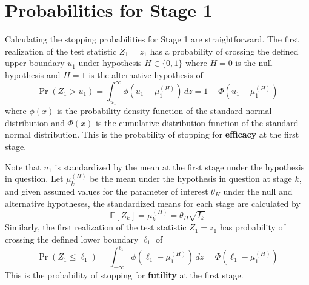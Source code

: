 \documentclass{article}
\begin{document}
\section{Probabilities for Stage 1}
%
Calculating the stopping probabilities for Stage 1 are straightforward. The first realization of the test statistic $Z_1=z_1$ has a probability of crossing the defined upper boundary $u_1$ under hypothesis $H\in\{0,1\}$ where $H=0$ is the null hypothesis and $H=1$ is the alternative hypothesis of
\begin{equation}
    \Pr(Z_1 > u_1)=\int_{u_1}^\infty \phi\left(u_1-\mu_1^{(H)}\right)\,dz=1-\Phi\left(u_1-\mu_1^{(H)}\right)
\end{equation}
%
where $\phi(x)$ is the probability density function of the standard normal distribution and $\Phi(x)$ is the cumulative distribution function of the standard normal distribution. This is the probability of stopping for \textbf{efficacy} at the first stage.

Note that $u_1$ is standardized by the mean at the first stage under the hypothesis in question. Let $\mu_{k}^{(H)}$ be the mean under the  hypothesis in question at stage $k$, and given assumed values for the parameter of interest $\theta_H$ under the null and alternative hypotheses, the standardized means for each stage are calculated by
%
\begin{equation} \label{eq:mu_k}
    \mathbb{E}[Z_k]=\mu_k^{(H)}=\theta_H\sqrt{I_k}
\end{equation}
%
Similarly, the first realization of the test statistic $Z_1=z_1$ has probability of crossing the defined lower boundary $\ell_1$ of
%
\begin{equation}
    \Pr(Z_1 \le \ell_1)=\int_{-\infty}^{\ell_1} \phi\left(\ell_1-\mu_1^{(H)}\right)\,dz=\Phi\left(\ell_1-\mu_1^{(H)}\right)
\end{equation}
%
This is the probability of stopping for \textbf{futility} at the first stage.
\end{document}
